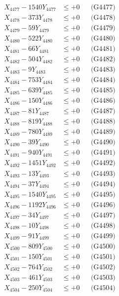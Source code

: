 \documentclass[a4paper,10pt]{article}
\begin{document}
{\begin{align}
X_{4477} - 1540Y_{4477} &\leq +0 && \text{(G4477)} \\
X_{4478} - 373Y_{4478} &\leq +0 && \text{(G4478)} \\
X_{4479} - 59Y_{4479} &\leq +0 && \text{(G4479)} \\
X_{4480} - 522Y_{4480} &\leq +0 && \text{(G4480)} \\
\allowbreak
X_{4481} - 66Y_{4481} &\leq +0 && \text{(G4481)} \\
X_{4482} - 504Y_{4482} &\leq +0 && \text{(G4482)} \\
X_{4483} - 9Y_{4483} &\leq +0 && \text{(G4483)} \\
X_{4484} - 753Y_{4484} &\leq +0 && \text{(G4484)} \\
X_{4485} - 639Y_{4485} &\leq +0 && \text{(G4485)} \\
X_{4486} - 150Y_{4486} &\leq +0 && \text{(G4486)} \\
X_{4487} - 81Y_{4487} &\leq +0 && \text{(G4487)} \\
X_{4488} - 819Y_{4488} &\leq +0 && \text{(G4488)} \\
X_{4489} - 780Y_{4489} &\leq +0 && \text{(G4489)} \\
X_{4490} - 39Y_{4490} &\leq +0 && \text{(G4490)} \\
\allowbreak
X_{4491} - 940Y_{4491} &\leq +0 && \text{(G4491)} \\
X_{4492} - 1451Y_{4492} &\leq +0 && \text{(G4492)} \\
X_{4493} - 13Y_{4493} &\leq +0 && \text{(G4493)} \\
X_{4494} - 37Y_{4494} &\leq +0 && \text{(G4494)} \\
X_{4495} - 1540Y_{4495} &\leq +0 && \text{(G4495)} \\
X_{4496} - 1192Y_{4496} &\leq +0 && \text{(G4496)} \\
X_{4497} - 34Y_{4497} &\leq +0 && \text{(G4497)} \\
X_{4498} - 10Y_{4498} &\leq +0 && \text{(G4498)} \\
X_{4499} - 91Y_{4499} &\leq +0 && \text{(G4499)} \\
X_{4500} - 809Y_{4500} &\leq +0 && \text{(G4500)} \\
\allowbreak
X_{4501} - 150Y_{4501} &\leq +0 && \text{(G4501)} \\
X_{4502} - 764Y_{4502} &\leq +0 && \text{(G4502)} \\
X_{4503} - 461Y_{4503} &\leq +0 && \text{(G4503)} \\
X_{4504} - 250Y_{4504} &\leq +0 && \text{(G4504)} \\

\end{align}}
\end{document}
